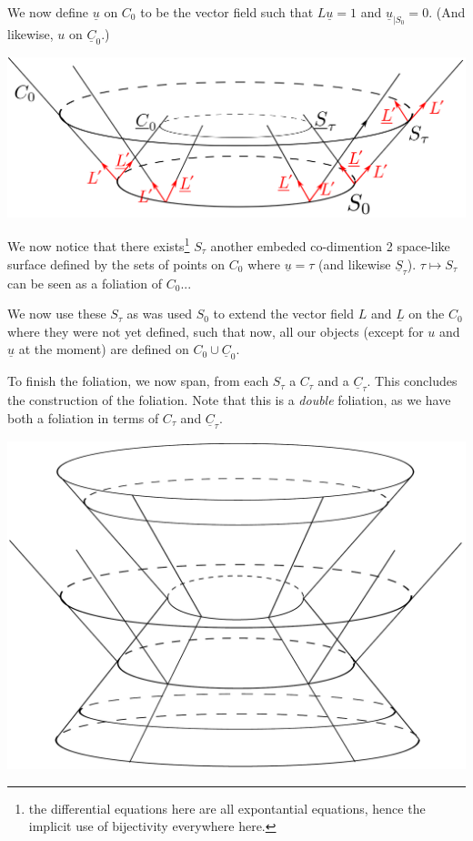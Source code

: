 \documentclass[a4paper,11pt]{article}
\numberwithin{equation}{section}
\theoremstyle{definition}
\newtheorem{comment}{Comment}
\begin{document}
We now define $\underline{u}$ on $C_0$ to be the vector field such that $L \underline{u}=1$ and $\underline{u}_{|S_0}=0$. (And likewise, $u$ on $\underline{C}_0$.)
\begin{center}
    \includegraphics [width=0.75\linewidth] {Pictures/02_VFields.png}
\end{center}

We now notice that there exists\footnote{the differential equations here are all expontantial equations, hence the implicit use of bijectivity everywhere here.} $S_\tau$ another embeded co-dimention 2 space-like surface defined by the sets of points on $C_0$ where $\underline{u}=\tau$ (and likewise $\underline{S}_\tau$). $\tau\mapsto S_\tau$ can be seen as a foliation of $C_0$...

We now use these $S_\tau$ as was used $S_0$ to extend the vector field $L$ and $\underline{L}$ on the $C_0$ where they were not yet defined, such that now, all our objects (except for $u$ and $\underline{u}$ at the moment) are defined on $C_0\cup\underline{C}_0$.

To finish the foliation, we now span, from each $S_\tau$ a $C_\tau$ and a $\underline{C}_\tau$. This concludes the construction of the foliation. Note that this is a \emph{double} foliation, as we have both a foliation in terms of $C_\tau$ and $\underline{C}_\tau$.
\begin{center}
    \includegraphics [width=0.75\linewidth] {Pictures/03_Foliation.png}
\end{center}
\end{document}
